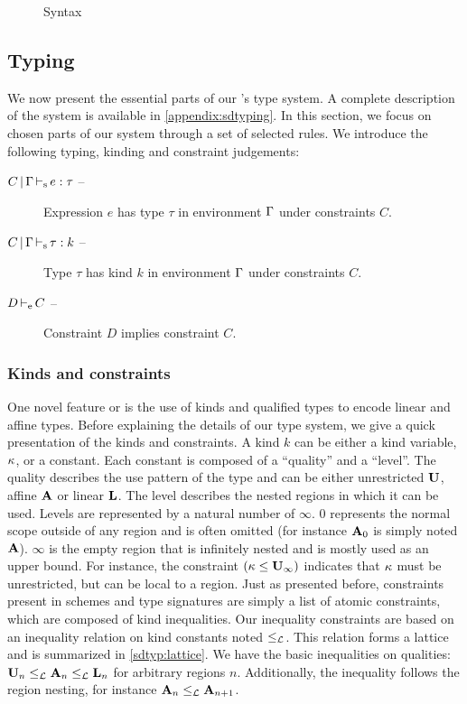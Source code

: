 
\begin{figure*}[t]
  \centering
  
  \caption{Syntax}
  \label{grammar}
\end{figure*}

\subsection{Typing}
\label{sdtyping}

We now present the essential parts of our \lang's type system. A complete
description of the system is available in \cref{appendix:sdtyping}.
In this section, we focus on chosen parts of our system
through a set of selected rules.
%
We introduce the following typing, kinding and constraint judgements:
\begin{description}
\item[$C \operatorname{|} \Gamma \operatorname{\vdash_s} e : \tau$ --]
  Expression $e$ has type $\tau$ in environment $\Gamma$ under constraints $C$.
\item[$C \operatorname{|} \Gamma \operatorname{\vdash_s} \tau : k$ --]
  Type $\tau$ has kind $k$ in environment $\Gamma$ under constraints $C$.
\item[$D \operatorname{\vdash_e} C$ --] Constraint $D$ implies constraint $C$.
\end{description}

\subsubsection{Kinds and constraints}

One novel feature or \affe is the use of kinds and qualified types to encode
linear and affine types. Before explaining the details of our type system, we
give a quick presentation of the kinds and constraints.
A kind $k$ can be either a kind variable, $\kappa$, or a constant.
Each constant is composed of a ``quality'' and a ``level''.
The quality describes the use pattern of the type and can be
either unrestricted $\mathbf{U}$, affine $\mathbf{A}$ or linear $\mathbf{L}$. The level
describes the nested regions in which it can be used. Levels are represented
by a natural number of $\infty$.
$0$ represents the normal scope outside of any region and is often omitted
(for instance $\mathbf{A}_0$ is simply noted $\mathbf{A}$).
$\infty$ is the empty region that is infinitely nested and is mostly used
as an upper bound.
For instance, the constraint $(\kappa \leq \mathbf{U}_\infty)$ indicates that
$\kappa$ must be unrestricted, but can be local to a region.
%
Just as presented before, constraints present in schemes and type signatures
are simply a list of atomic constraints, which are composed
of kind inequalities.
%
Our inequality constraints are based on an inequality relation on
kind constants noted $\leq_\mathcal L$. This relation forms a lattice
and  is summarized in
\cref{sdtyp:lattice}. We have the basic inequalities on qualities:
$\mathbf{U}_n \leq_\mathcal L \mathbf{A}_n \leq_\mathcal L \mathbf{L}_n$ for arbitrary regions $n$.
Additionally, the inequality follows the region nesting, for
instance $\mathbf{A}_n \leq_\mathcal L \mathbf{A}_{n+1}$.

